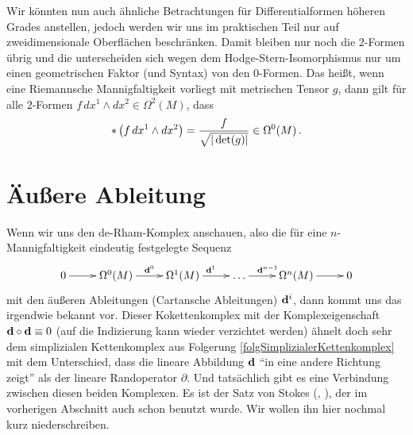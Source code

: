 \begin{bemerkung}
    Wir könnten nun auch ähnliche Betrachtungen für Differentialformen höheren Grades anstellen, jedoch werden wir uns im praktischen Teil nur auf zweidimensionale Oberflächen beschränken.
    Damit bleiben nur noch die \( 2 \)-Formen übrig und die unterscheiden sich wegen dem Hodge-Stern-Isomorphismus nur um einen geometrischen Faktor (und Syntax) von den \( 0 \)-Formen.
    Das heißt, wenn eine Riemannsche Mannigfaltigkeit vorliegt mit metrischen Tensor \( g \), dann gilt für alle \( 2 \)-Formen \( f \, dx^{1}\wedge dx^{2} \in \Omega^{2}(M)\), dass
    \begin{align}
      \label{eqHodgeIso2Form}
      * \left( f \, dx^{1}\wedge dx^{2} \right) = \frac{f}{\sqrt{|\det(g)|}} \in \Omega^{0}(M) \,\text{.}
    \end{align}
  \end{bemerkung}




  
  

\section{Äußere Ableitung}
  
  Wenn wir uns den de-Rham-Komplex anschauen, also die für eine \( n \)-Mannigfaltigkeit eindeutig festgelegte Sequenz
    \begin{align}
      \begin{xy}
        \xymatrix{
          0 \ar[r] & 
          \Omega^{0}(M) \ar[r]^{\exd^{0}} &
          \Omega^{1}(M) \ar[r]^{\exd^{1}} &
          \ldots \ar[r]^{\exd^{n-1}} &
          \Omega^{n}(M) \ar[r] &
          0 \\
        }
      \end{xy}
    \end{align}
  mit den äußeren Ableitungen (Cartansche Ableitungen) \( \mathbf{d}^{i} \), dann kommt uns das irgendwie bekannt vor.
  Dieser Kokettenkomplex mit der Komplexeigenschaft \( \mathbf{d}\circ\mathbf{d} \equiv 0 \) (auf die Indizierung kann wieder verzichtet werden) ähnelt
  doch sehr dem simplizialen Kettenkomplex aus Folgerung \ref{folgSimplizialerKettenkomplex} mit dem Unterschied, dass die lineare
  Abbildung \( \mathbf{d} \) "`in eine andere Richtung zeigt"' als der lineare Randoperator \( \partial \).
  Und tatsächlich gibt es eine Verbindung zwischen diesen beiden Komplexen.
  Es ist der Satz von Stokes 
  (\cite[Kap.7.2]{Marsden}, \cite[Kap.9]{jaenich}), der im vorherigen Abschnitt auch schon benutzt wurde.
  Wir wollen ihn hier nochmal kurz niederschreiben.

